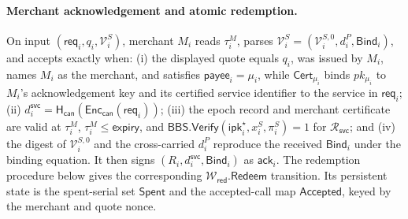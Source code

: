 \documentclass[letterpaper]{article}
\newcommand{\hash}{\mathsf{H}_{\mathsf{can}}}
\begin{document}
\paragraph{Merchant acknowledgement and atomic redemption.}
On input \((\mathsf{req}_i,q_i,\mathcal V_i^S)\), merchant \(M_i\) reads
\(\tau_i^M\), parses
\(\mathcal V_i^S=(\mathcal V_i^{S,0},d_i^P,\mathsf{Bind}_i)\), and accepts
exactly when: (i) the displayed quote equals \(q_i\), was issued by \(M_i\),
names \(M_i\) as the merchant, and satisfies
\(\mathsf{payee}_i=\mu_i\), while
\(\mathsf{Cert}_{\mu_i}\) binds \(pk_{\mu_i}\) to \(M_i\)'s
acknowledgement key and its certified service identifier to the service in
\(\mathsf{req}_i\);
(ii) \(d_i^{\mathsf{svc}}=\hash(\mathsf{Enc}_{\mathsf{can}}(
\mathsf{req}_i))\); (iii) the epoch record and merchant certificate are valid
at \(\tau_i^M\), \(\tau_i^M\le\mathsf{expiry}\), and
\(\mathsf{BBS.Verify}(\mathsf{ipk}_i^\star,x_i^S,\pi_i^S)=1\) for
\(\mathcal R_{\mathsf{svc}}\); and (iv) the digest of
\(\mathcal V_i^{S,0}\) and the cross-carried \(d_i^P\) reproduce the received
\(\mathsf{Bind}_i\) under the binding equation.  It then signs
\((R_i,d_i^{\mathsf{svc}},\mathsf{Bind}_i)\) as \(\mathsf{ack}_i\).
The redemption procedure below gives the corresponding
\(\mathcal W_{\mathsf{red}}.\mathsf{Redeem}\) transition.  Its persistent
state is the spent-serial set \(\mathsf{Spent}\) and the accepted-call map
\(\mathsf{Accepted}\), keyed by the merchant and quote nonce.
\end{document}
